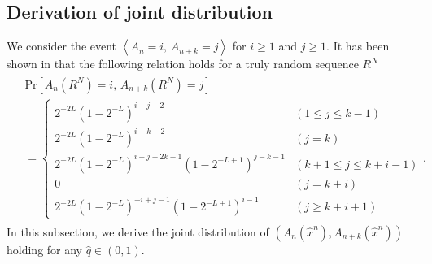 \documentclass[dvipdfmx,english]{ampmt} %
\begin{document}
\subsection{Derivation of joint distribution}\label{subsec:4-2}
We consider the event $\left< A_n=i,\, A_{n+k}=j \right>$ for $i\geq 1$ and $j\geq 1$. 
It has been shown in \cite{coron1998accurate} that the following relation holds for a truly random sequence $R^N$
%
\begin{align}\begin{split}
  &\mathrm{Pr}[A_n(R^N)=i,\, A_{n+k}(R^N)=j] \\
   &=\left\{ \begin{array}{ll}
    2^{-2L}(1-2^{-L})^{i+j-2} & (1 \leq j \leq k-1) \\
    2^{-2L}(1-2^{-L})^{i+k-2} & (j=k) \\
    2^{-2L}(1-2^{-L})^{i-j+2k-1} \left( 1 - 2^{-L+1} \right)^{j-k-1} & (k+1 \leq j \leq k+i-1) \\
    0 & (j=k+i) \\
    2^{-2L}(1-2^{-L})^{-i+j-1} \left( 1 - 2^{-L+1} \right)^{i-1} & (j \geq k+i+1) 
  \end{array} \right..
\end{split}\end{align}
In this subsection, we derive the joint distribution of $(A_n(\hat{x}^n),A_{n+k}(\hat{x}^n))$ holding for any $\hat{q} \in (0,1)$.
\end{document}
